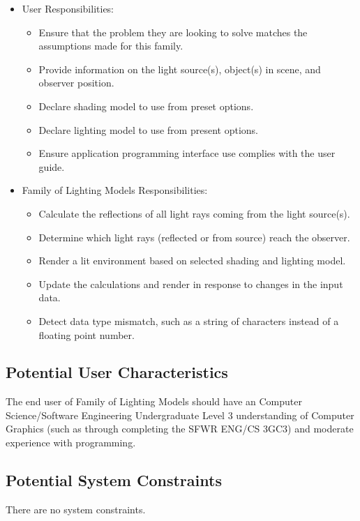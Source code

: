\documentclass[12pt]{article}
\newcommand{\famname}{Family of Lighting Models} %
\begin{document}
\begin{itemize}
\item User Responsibilities:
\begin{itemize}
\item Ensure that the problem they are looking to solve matches the assumptions 
made for this family.
\item Provide information on the light source(s), object(s) in scene, and 
observer position.
\item Declare shading model to use from preset options.
\item Declare lighting model to use from present options.
\item Ensure application programming interface use complies with the user guide.
\end{itemize}
\item \famname{} Responsibilities:
\begin{itemize}
\item Calculate the reflections of all light rays coming from the light 
source(s).
\item Determine which light rays (reflected or from source) reach the observer.
\item Render a lit environment based on selected shading and lighting model.
\item Update the calculations and render in response to changes in the input 
data.
\item Detect data type mismatch, such as a string of characters instead of a
  floating point number.
\end{itemize}
\end{itemize}

\subsection{Potential User Characteristics} \label{SecUserCharacteristics}
The end user of \famname{} should have an Computer Science/Software Engineering 
Undergraduate Level 3 understanding of Computer Graphics (such as through 
completing the SFWR ENG/CS 3GC3) and moderate experience with programming.

\subsection{Potential System Constraints}
There are no system constraints.

%
%
\end{document}
